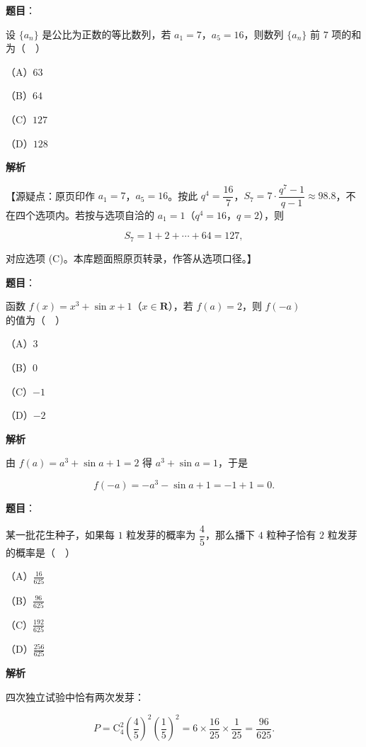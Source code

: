 \begin{answer}

\textbf{题目}：

设 $\{a_n\}$ 是公比为正数的等比数列，若 $a_1=7$，$a_5=16$，则数列 $\{a_n\}$ 前 $7$ 项的和为（　）

（A）$63$

（B）$64$

（C）$127$

（D）$128$

\textbf{解析}

【源疑点：原页印作 $a_1=7$，$a_5=16$。按此 $q^4=\dfrac{16}7$，$S_7=7\cdot\dfrac{q^7-1}{q-1}\approx98.8$，不在四个选项内。若按与选项自洽的 $a_1=1$（$q^4=16$，$q=2$），则

\nopagebreak[4]
\[S_7=1+2+\cdots+64=127,\]

对应选项 (C)。本库题面照原页转录，作答从选项口径。】


\end{answer}
\begin{answer}

\textbf{题目}：

函数 $f(x)=x^3+\sin x+1$（$x\in\mathbf R$），若 $f(a)=2$，则 $f(-a)$ 的值为（　）

（A）$3$

（B）$0$

（C）$-1$

（D）$-2$

\textbf{解析}

由 $f(a)=a^3+\sin a+1=2$ 得 $a^3+\sin a=1$，于是

\nopagebreak[4]
\[f(-a)=-a^3-\sin a+1=-1+1=0.\]


\end{answer}
\begin{answer}

\textbf{题目}：

某一批花生种子，如果每 $1$ 粒发芽的概率为 $\dfrac45$，那么播下 $4$ 粒种子恰有 $2$ 粒发芽的概率是（　）

（A）$\frac{16}{625}$

（B）$\frac{96}{625}$

（C）$\frac{192}{625}$

（D）$\frac{256}{625}$

\textbf{解析}

四次独立试验中恰有两次发芽：

\nopagebreak[4]
\[P=\mathrm C_4^2\left(\frac45\right)^2\left(\frac15\right)^2=6\times\frac{16}{25}\times\frac1{25}=\frac{96}{625}.\]


\end{answer}

